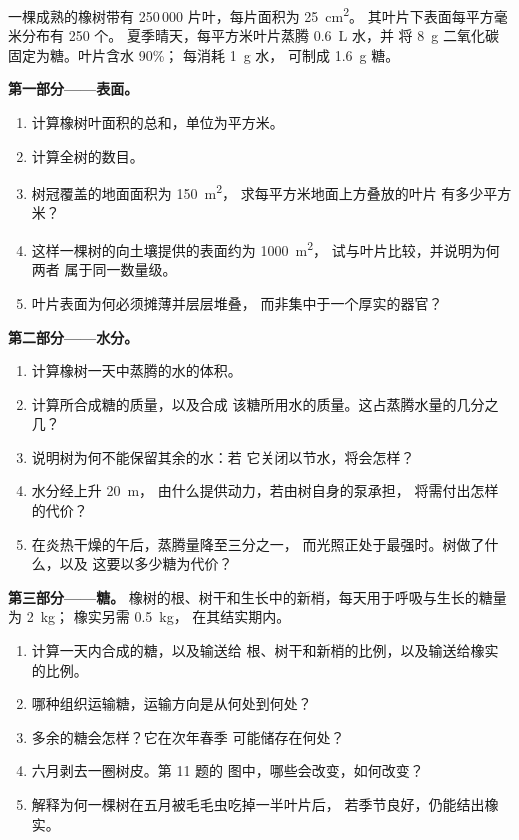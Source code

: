 \begin{problem}
\label{pb:g12:plant-rooted-life:1}
一棵成熟的橡树带有 250\,000 片叶，每片面积为 \qty{25}{cm^2}。
其叶片下表面每平方毫米分布有 250 个。
夏季晴天，每平方米叶片蒸腾 \qty{0.6}{L} 水，并
将 \qty{8}{g} 二氧化碳固定为糖。叶片含水 90\%；
每消耗 \qty{1}{g} 水，
可制成 \qty{1.6}{g} 糖。

\medskip
\noindent\textbf{第一部分——表面。}
\begin{enumerate}
  \item 计算橡树叶面积的总和，单位为平方米。
  \item 计算全树的数目。
  \item 树冠覆盖的地面面积为 \qty{150}{m^2}，
        求每平方米地面上方叠放的叶片
        有多少平方米？
  \item 这样一棵树的向土壤提供的表面约为 \qty{1000}{m^2}，
        试与叶片比较，并说明为何两者
        属于同一数量级。
  \item 叶片表面为何必须摊薄并层层堆叠，
        而非集中于一个厚实的器官？
\end{enumerate}

\medskip
\noindent\textbf{第二部分——水分。}
\begin{enumerate}[resume]
  \item 计算橡树一天中蒸腾的水的体积。
  \item 计算所合成糖的质量，以及合成
        该糖所用水的质量。这占蒸腾水量的几分之几？
  \item 说明树为何不能保留其余的水：若
        它关闭以节水，将会怎样？
  \item 水分经上升 \qty{20}{m}，
        由什么提供动力，若由树自身的泵承担，
        将需付出怎样的代价？
  \item 在炎热干燥的午后，蒸腾量降至三分之一，
        而光照正处于最强时。树做了什么，以及
        这要以多少糖为代价？
\end{enumerate}

\medskip
\noindent\textbf{第三部分——糖。}
橡树的根、树干和生长中的新梢，每天用于呼吸与生长的糖量为 \qty{2}{kg}；
橡实另需 \qty{0.5}{kg}，
在其结实期内。
\begin{enumerate}[resume]
  \item 计算一天内合成的糖，以及输送给
        根、树干和新梢的比例，以及输送给橡实的比例。
  \item 哪种组织运输糖，运输方向是从何处到何处？
  \item 多余的糖会怎样？它在次年春季
        可能储存在何处？
  \item 六月剥去一圈树皮。第 11 题的
        图中，哪些会改变，如何改变？
  \item 解释为何一棵树在五月被毛毛虫吃掉一半叶片后，
        若季节良好，仍能结出橡实。
\end{enumerate}


\end{problem}

